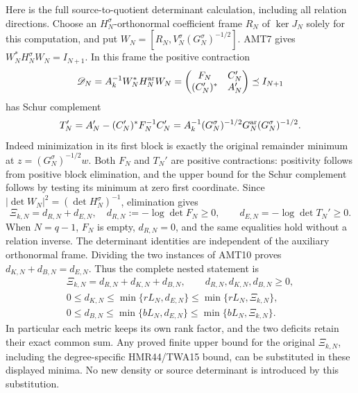 \documentclass[11pt,a4paper]{article}
\begin{document}
Here is the full source-to-quotient determinant calculation, including
all relation directions. Choose an $H_N^\sigma$-orthonormal
coefficient frame $R_N$ of $\ker J_N$ solely for this computation,
and put $W_N=[R_N,V_N^\sigma(G_N^\sigma)^{-1/2}]$.
AMT7 gives $W_N^*H_N^\sigma W_N=I_{N+1}$. In this frame the
positive contraction
\[
 \mathscr D_N=A_k^{-1}W_N^*H_N^{\rm ar}W_N
       =\begin{pmatrix}F_N&C_N'\\(C_N')^*&A_N'\end{pmatrix}
       \preceq I_{N+1}
\]
has Schur complement
\[
 T_N'=A_N'-(C_N')^*F_N^{-1}C_N'
       =A_k^{-1}(G_N^\sigma)^{-1/2}G_N^{\rm ar}(G_N^\sigma)^{-1/2}.
\]
Indeed minimization in its first block is exactly the original
remainder minimum at $z=(G_N^\sigma)^{-1/2}w$.
Both $F_N$ and $T_N'$ are positive contractions: positivity follows
from positive block elimination, and the upper bound for the Schur
complement follows by testing its minimum at zero first coordinate.
Since $|\det W_N|^2=(\det H_N^\sigma)^{-1}$, elimination gives
\[
 \Xi_{k,N}=d_{R,N}+d_{E,N},\quad d_{R,N}:=-\log\det F_N\ge0,
 \qquad d_{E,N}=-\log\det T_N'\ge0.
 \tag{AMT13}
\]
When $N=q-1$, $F_N$ is empty, $d_{R,N}=0$, and the same equalities
hold without a relation inverse. The determinant identities are
independent of the auxiliary orthonormal frame.
Dividing the two instances of AMT10 proves
$d_{K,N}+d_{B,N}=d_{E,N}$. Thus the complete nested statement is
\[
\boxed{\begin{gathered}
 \Xi_{k,N}=d_{R,N}+d_{K,N}+d_{B,N},\qquad d_{R,N},d_{K,N},d_{B,N}\ge0,\\
 0\le d_{K,N}\le\min\{rL_N,d_{E,N}\}\le\min\{rL_N,\Xi_{k,N}\},\\
 0\le d_{B,N}\le\min\{bL_N,d_{E,N}\}\le\min\{bL_N,\Xi_{k,N}\}.
\end{gathered}}\tag{AMT14}
\]
In particular each metric keeps its own rank factor, and the two
deficits retain their exact common sum. Any proved finite upper
bound for the original $\Xi_{k,N}$, including the degree-specific
HMR44/TWA15 bound, can be substituted in these displayed minima.
No new density or source determinant is introduced by this substitution.
\end{document}
